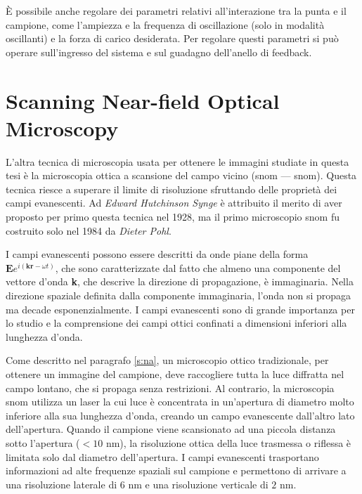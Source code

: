 \documentclass[../main.tex]{subfiles}
\begin{document}
È possibile anche regolare dei parametri relativi all'interazione tra la punta e il campione, come l'ampiezza e la frequenza di oscillazione (solo in modalità oscillanti) e la forza di carico desiderata. Per regolare questi parametri si può operare sull'ingresso del sistema e sul guadagno dell'anello di feedback.\\

\section{Scanning Near-field Optical Microscopy}

L'altra tecnica di microscopia usata per ottenere le immagini studiate in questa tesi è la microscopia ottica a scansione del campo vicino (\acrlong{snom} --- \acrshort{snom}). Questa tecnica riesce a superare il limite di risoluzione sfruttando delle proprietà dei campi evanescenti. Ad \textit{Edward Hutchinson Synge} è attribuito il merito di aver proposto per primo questa tecnica nel 1928,\cite{synge_1928} ma il primo microscopio \acrshort{snom} fu costruito solo nel 1984 da \textit{Dieter Pohl}.\cite{pohl_1984}

I campi evanescenti possono essere descritti da onde piane della forma $\mathbf{E}e^{i(\mathbf{kr}-\omega t)}$, che sono caratterizzate dal fatto che almeno una componente del vettore d'onda \textbf{k}, che descrive la direzione di propagazione, è immaginaria. Nella direzione spaziale definita dalla componente immaginaria, l'onda non si propaga ma decade esponenzialmente. I campi evanescenti sono di grande importanza per lo studio e la comprensione dei campi ottici confinati a dimensioni inferiori alla lunghezza d'onda.\cite{novotny_2012}

Come descritto nel paragrafo \ref{s:na}, un microscopio ottico tradizionale, per ottenere un immagine del campione, deve raccogliere tutta la luce diffratta nel campo lontano, che si propaga senza restrizioni.
Al contrario, la microscopia \acrshort{snom} utilizza un laser la cui luce è concentrata in un'apertura di diametro molto inferiore alla sua lunghezza d'onda, creando un campo evanescente dall'altro lato dell'apertura.\cite{betzig_1992} Quando il campione viene scansionato ad una piccola distanza sotto l'apertura ($<10$ nm), la risoluzione ottica della luce trasmessa o riflessa è limitata solo dal diametro dell'apertura. I campi evanescenti trasportano informazioni ad alte frequenze spaziali sul campione e permettono di arrivare a una risoluzione laterale di $6$ nm\cite{ma_2021} e una risoluzione verticale di $2$ nm.\cite{oshikane_2007}\\
\end{document}
